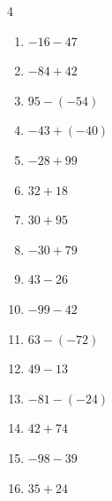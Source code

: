\begin{multicols}{4}
\begin{enumerate}
  \item $-16-47$

        \phantom{$=-63$}

  \item $-84+42$

        \phantom{$=-42$}

  \item $95-(-54)$

        \phantom{$=149$}

  \item $-43+(-40)$

        \phantom{$=-83$}

  \item $-28+99$

        \phantom{$=71$}

\columnbreak %

  \item $32+18$

        \phantom{$=50$}

  \item $30+95$

        \phantom{$=125$}

  \item $-30+79$

        \phantom{$=49$}

  \item $43-26$

        \phantom{$=17$}

  \item $-99-42$

        \phantom{$=-141$}

  \item $63-(-72)$

        \phantom{$=135$}

  \item $49-13$

        \phantom{$=36$}

  \item $-81-(-24)$

        \phantom{$=-57$}

  \item $42+74$

        \phantom{$=116$}

  \item $-98-39$

        \phantom{$=-137$}

  \item $35+24$


\end{enumerate}
\end{multicols}
